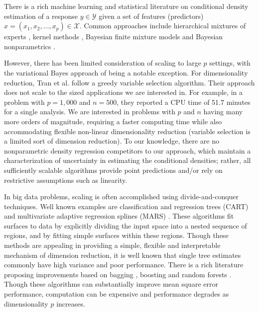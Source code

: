 \documentclass{article} %
\begin{document}
There is a rich machine learning and statistical literature on conditional density estimation of a response $y \in \mathcal{Y}$ given a set of features (predictors) $x=(x_1, x_2, \ldots, x_p)\in \mathcal{X}$. Common approaches include hierarchical mixtures of experts \cite{mixtureexperts,jiang1999}, kernel methods \cite{fan1996,fanyim2004,holmes2010,fu2011}, Bayesian finite mixture models \cite{nott2012,tran2012,norets2012} and Bayesian nonparametrics 
\cite{griffin06, dunson2007, DunsonPark, chung2009, tokdar2010}.  

However, there has been limited consideration of scaling to large $p$ settings, with the variational Bayes approach of \cite{tran2012} being a notable exception. For dimensionality reduction, Tran et al. follow a greedy variable selection algorithm.  Their approach does not scale to the sized applications we are interested in. For example, in a problem with $p=1,000$ and $n=500$, they reported a CPU time of 51.7 minutes for a single analysis.  We are interested in problems with  $p$ and $n$ having many more orders of magnitude, requiring a faster computing time while also accommodating flexible non-linear dimensionality reduction (variable selection is a limited sort of dimension reduction).  To our knowledge, there are no nonparametric density regression competitors to our approach, which maintain a characterization of uncertainty in estimating the conditional densities; rather, all sufficiently scalable algorithms provide point predictions and/or rely on restrictive assumptions such as linearity.  

In big data problems, scaling is often accomplished using divide-and-conquer techniques. Well known examples are classification and regression trees (CART) \cite{CART} and multivariate adaptive regression splines (MARS) \cite{MARS}. These algorithms fit surfaces to data by explicitly dividing the input space into a nested sequence of regions, and by fitting simple surfaces  within these regions. Though these methods are appealing in providing a simple, flexible and interpretable mechanism of dimension reduction, it is well known that single tree estimates commonly have high variance and poor performance.  There is a rich literature proposing improvements based on bagging \cite{Bagging}, boosting \cite{Boosting} and random forests \cite{RandomForest}. Though these algorithms can substantially improve mean square error performance, computation can be expensive and performance degrades as dimensionality $p$ increases.
\end{document}
